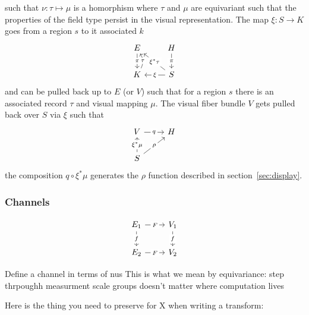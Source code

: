 \documentclass[../main.tex]{subfiles}
\begin{document}
such that $\nu: \tau \mapsto \mu$ is a homorphism where $\tau$ and $\mu$ are equivariant such that the properties of the field type persist in the visual representation. The map $\xi: S \rightarrow K$ goes from a region $s$ to it associated $k$ 
\begin{equation}
    \begin{tikzcd}
        E \arrow[d, "\pi" description]              & H \arrow[d, "\pi" description]                                    \\
        K \arrow[u, "\tau" description, bend right] & S \arrow[l, "\xi" description] \arrow[lu, "\xi^*\tau" description]
        \end{tikzcd}
\end{equation}
and can be pulled back up to $E$ (or $V$) such that for a region $s$ there is an associated record $\tau$ and visual mapping $\mu$. The visual fiber bundle $V$ gets pulled back over $S$ via $\xi$ such that 
\begin{equation}
    \begin{tikzcd}
        V \arrow[r, "q" description]                                       & H \\
        S \arrow[u, "\xi^*\mu" description] \arrow[ru, "\rho" description] &  
    \end{tikzcd}
\end{equation}
the composition $q \circ \xi^*\mu$ generates the $\rho$ function described in section~\ref{sec:display}. 



\subsubsection{Channels}
\begin{equation}
    \begin{tikzcd}
        E_1 \arrow[r, "F" description] \arrow[d, "f" description] & V_1 \arrow[d, "f" description] \\
        E_2 \arrow[r, "F" description]                            & V_2                           
    \end{tikzcd}
\end{equation}

Define a channel in terms of nus
This is what we mean by equivariance: 
step thrpoughh measurment scale groups
doesn't matter where computation lives

Here is the thing you need to preserve for {X} when writing a transform:
\end{document}
